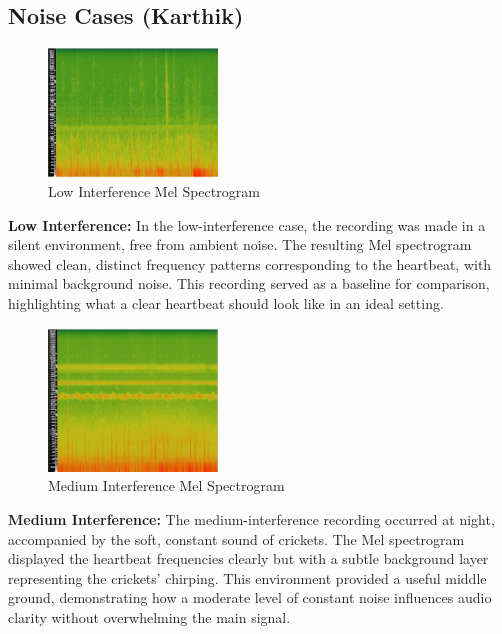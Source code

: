 \documentclass[conference]{IEEEtran}
\begin{document}
\subsection{Noise Cases (Karthik)}

\begin{figure}
    \centering
    \includegraphics[width=0.4\textwidth]{Images/lownoise.png}
    \caption{Low Interference Mel Spectrogram}
    \label{fig:mel_spectrogram}
\end{figure}

\textbf{Low Interference:}  
In the low-interference case, the recording was made in a silent environment, free from ambient noise. The resulting Mel spectrogram showed clean, distinct frequency patterns corresponding to the heartbeat, with minimal background noise. This recording served as a baseline for comparison, highlighting what a clear heartbeat should look like in an ideal setting.

\begin{figure}
    \centering
    \includegraphics[width=0.4\textwidth]{Images/midnoise.png}
    \caption{Medium Interference Mel Spectrogram}
    \label{fig:mel_spectrogram}
\end{figure}

\textbf{Medium Interference:}  
The medium-interference recording occurred at night, accompanied by the soft, constant sound of crickets. The Mel spectrogram displayed the heartbeat frequencies clearly but with a subtle background layer representing the crickets’ chirping. This environment provided a useful middle ground, demonstrating how a moderate level of constant noise influences audio clarity without overwhelming the main signal.
\end{document}
